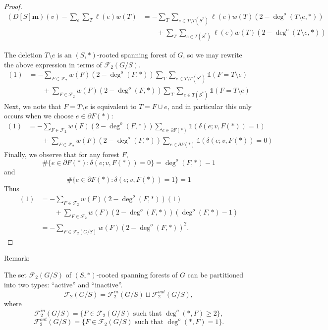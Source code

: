\documentclass{amsart}
\theoremstyle{definition}
\newcommand{\one}{\mathds{1}}
\newcommand{\forests}{\mathcal{F}}
\begin{document}
\begin{proof}
\begin{align*}
(D[S] \mathbf{m})(v) - \sum_{e} \sum_{T }  \ell(e) w(T) 
&= - \sum_T \sum_{e \in T\setminus T(S^*)} \ell(e) w(T) ( 2 - \deg^o(T\setminus e,*)) \\
&\qquad + \sum_T \sum_{e  \in T(S^*)} \ell(e) w(T) (2 - \deg^o(T\setminus e,*) )
\end{align*}

The deletion $T \setminus e$ is an $(S,*)$-rooted spanning forest of $G$,
so we may rewrite the above expression in terms of $\forests_2(G/S)$.
\begin{align*}
(1) &= - \sum_{F \in \forests_2} w(F) (2 - \deg^o(F,*)) \sum_{T} \sum_{e \in T\setminus T(S^*)} \one(F = T \setminus e)  \\
&\qquad +  \sum_{F \in \forests_2} w(F) (2 - \deg^o(F,*)) \sum_{T} \sum_{e \in T(S^*)} \one(F = T \setminus e) 
\end{align*}
Next, we note that $F = T \setminus e$ is equivalent to $T = F \cup e$, and in particular this only occurs when we choose $e \in \partial F(*)$:
\begin{align*}
(1) &= - \sum_{F \in \forests_2} w(F) (2 - \deg^o(F,*))  \sum_{e \in \partial F(*)} \one( \delta(e; v, F(*)) = 1)  \\
&\qquad +  \sum_{F \in \forests_2} w(F) (2 - \deg^o(F,*)) \sum_{e\in \partial F(*)} \one(\delta(e; v, F(*))=0) 
\end{align*}
Finally, we observe that for any forest $F$,
$$
\#\{e \in \partial F(*) : \delta(e;v, F(*)) = 0 \} = \deg^o(F,*) - 1
$$
and
$$
\#\{e \in \partial F(*) : \delta(e;v, F(*)) = 1 \} = 1
$$
Thus
\begin{align*}
(1) 
&= - \sum_{F \in \forests_2} w(F) (2 - \deg^o(F,*))  (1)  \\
&\qquad +  \sum_{F \in \forests_2} w(F) (2 - \deg^o(F,*)) (\deg^o(F,*) - 1) \\
&= - \!\!\!\sum_{F \in \forests_2(G/S)} w(F) (2 - \deg^o(F,*))^2 .
\end{align*}

\end{proof}


Remark: 

The set $\forests_2(G/S)$ of $(S,*)$-rooted spanning forests of $G$ can be partitioned into two types: ``active'' and ``inactive''.
$$
\forests_2(G/S) = \forests_2^{in}(G/S) \sqcup \forests_2^{out}(G/S),
$$
where
$$
\forests_2^{in}(G/S)  = \{ F \in \forests_2(G/S) \text{ such that } \deg^o(*,F) \geq 2\},
$$
$$
\forests_2^{out}(G/S)  = \{ F \in \forests_2(G/S) \text{ such that } \deg^o(*,F) = 1\}.
$$
\end{document}
